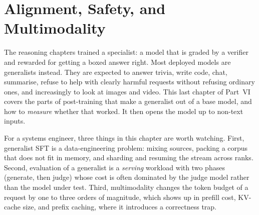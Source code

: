 \chapter{Alignment, Safety, and Multimodality}\label{ch:alignment}

The reasoning chapters trained a specialist: a model that is graded by a verifier and rewarded
for getting a boxed answer right. Most deployed models are generalists instead. They are
expected to answer trivia, write code, chat, summarise, refuse to help with clearly harmful
requests without refusing ordinary ones, and increasingly to look at images and video. This
last chapter of Part~VI covers the parts of post-training that make a generalist out of a base
model, and how to \emph{measure} whether that worked. It then opens the model up to non-text
inputs.

For a systems engineer, three things in this chapter are worth watching. First, generalist
SFT is a data-engineering problem: mixing sources, packing a corpus that does not fit in
memory, and sharding and resuming the stream across ranks. Second, evaluation of a generalist is
a \emph{serving} workload with two phases (generate, then judge) whose cost is often dominated by
the judge model rather than the model under test. Third, multimodality changes the token budget
of a request by one to three orders of magnitude, which shows up in prefill cost, KV-cache
size, and prefix caching, where it introduces a correctness trap.

